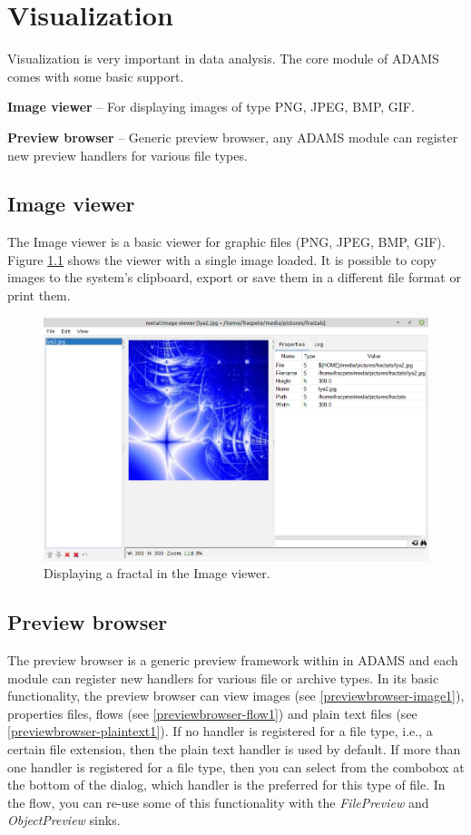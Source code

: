 
\chapter{Visualization}
Visualization is very important in data analysis. The core module of ADAMS
comes with some basic support.
\begin{tight_itemize}
	\item \textbf{Image viewer} -- For displaying images of type PNG, JPEG, BMP,
	GIF.
	\item \textbf{Preview browser} -- Generic preview browser, any ADAMS module can
	register new preview handlers for various file types.
\end{tight_itemize}

\section{Image viewer}
The Image viewer is a basic viewer for graphic files (PNG, JPEG, BMP, GIF).
Figure \ref{imageviewer1} shows the viewer with a single image loaded. It is
possible to copy images to the system's clipboard, export or save them in a
different file format or print them.

\begin{figure}[htb]
  \centering
  \includegraphics[width=12.0cm]{images/imageviewer1.png}
  \caption{Displaying a fractal in the Image viewer.}
  \label{imageviewer1}
\end{figure}

\section{Preview browser}
The preview browser is a generic preview framework within in ADAMS and each
module can register new handlers for various file or archive types. In its basic
functionality, the preview browser can view images (see
\ref{previewbrowser-image1}), properties files, flows (see
\ref{previewbrowser-flow1}) and plain text files (see
\ref{previewbrowser-plaintext1}). If no handler is registered for a file type,
i.e., a certain file extension, then the plain text handler is used by default.
If more than one handler is registered for a file type, then you can select
from the combobox at the bottom of the dialog, which handler is the preferred
for this type of file. In the flow, you can re-use some of this functionality
with the \textit{FilePreview} and \textit{ObjectPreview} sinks.


